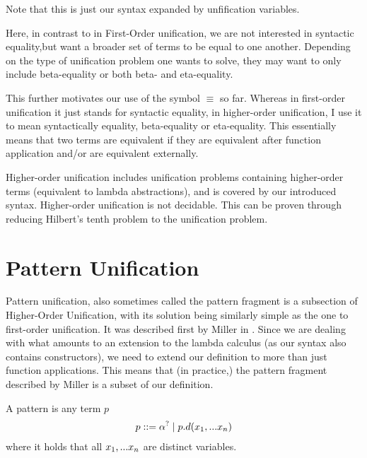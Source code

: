 \documentclass[twoside,12pt,a4paper]{article}
\begin{document}
Note that this is just our syntax expanded by unfification variables.


Here, in contrast to in First-Order unification, we are not interested in syntactic equality,but want a broader set of terms to be equal to one another.
Depending on the type of unification problem one wants to solve, they may want to only include beta-equality or both 
beta- and eta-equality.

This further motivates our use of the symbol $\equiv$ so far. Whereas in first-order unification it just stands for syntactic equality, 
in higher-order unification, I use it to mean syntactically equality, beta-equality or eta-equality.
This essentially means that two terms are equivalent if they are equivalent after function application and/or are equivalent externally.

\begin{theorem}
    Higher-order unification includes unification problems containing higher-order terms (equivalent to lambda abstractions),
    and is covered by our introduced syntax. %
    Higher-order unification is not decidable. This can be proven through reducing Hilbert's tenth problem to the unification problem.
\end{theorem}


\section{Pattern Unification}

Pattern unification, also sometimes called the pattern fragment
is a subsection of Higher-Order Unification,
with its solution being similarly simple as the one to first-order unification.
It was described first by Miller in \cite{10.1093/logcom/1.4.497}.
Since we are dealing with what amounts to an extension to the lambda calculus (as our syntax also contains constructors), we need to extend our definition to more than just function applications. 
This means that (in practice,) the pattern fragment described by Miller is a subset of our definition.

\begin{definition}[Pattern]
    A pattern is any term $p$ 
    \begin{align*}
        p ::= \alpha^? \;|\; p.d(x_1,...x_n)
    \end{align*}
    where it holds that all $x_1,...x_n$ are distinct variables.
\end{definition}
\end{document}
